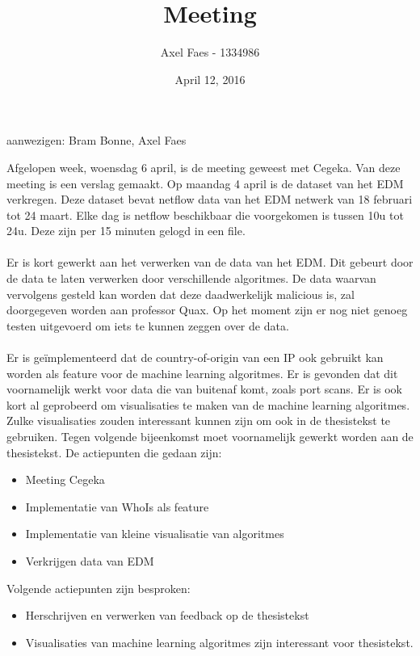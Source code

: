 \documentclass[notitlepage]{article}
\title{Meeting}
\author{Axel Faes - 1334986}
\date{April 12, 2016}
\begin{document}
\maketitle

aanwezigen: Bram Bonne, Axel Faes

Afgelopen week, woensdag 6 april, is de meeting geweest met Cegeka. Van deze meeting is een verslag gemaakt. Op maandag 4 april is de dataset van het EDM verkregen. Deze dataset bevat netflow data van het EDM netwerk van 18 februari tot 24 maart. Elke dag is netflow beschikbaar die voorgekomen is tussen 10u tot 24u. Deze zijn per 15 minuten gelogd in een file. \\\\
Er is kort gewerkt aan het verwerken van de data van het EDM. Dit gebeurt door de data te laten verwerken door verschillende algoritmes. De data waarvan vervolgens gesteld kan worden dat deze daadwerkelijk malicious is, zal doorgegeven worden aan professor Quax. Op het moment zijn er nog niet genoeg testen uitgevoerd om iets te kunnen zeggen over de data. \\\\
Er is ge\"implementeerd dat de country-of-origin van een IP ook gebruikt kan worden als feature voor de machine learning algoritmes. Er is gevonden dat dit voornamelijk werkt voor data die van buitenaf komt, zoals port scans. Er is ook kort al geprobeerd om visualisaties te maken van de machine learning algoritmes. Zulke visualisaties zouden interessant kunnen zijn om ook in de thesistekst te gebruiken. Tegen volgende bijeenkomst moet voornamelijk gewerkt worden aan de thesistekst.
De actiepunten die gedaan zijn:
\begin{itemize}  
		\item Meeting Cegeka
        \item Implementatie van WhoIs als feature
        \item Implementatie van kleine visualisatie van algoritmes
        \item  Verkrijgen data van EDM
\end{itemize}

Volgende actiepunten zijn besproken:
\begin{itemize}  		
		\item Herschrijven en verwerken van feedback op de thesistekst
        \item Visualisaties van machine learning algoritmes zijn interessant voor thesistekst.
\end{itemize}
\end{document}
